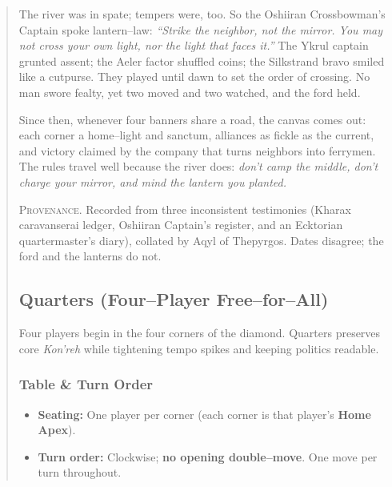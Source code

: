 \documentclass[11pt]{article}
\begin{document}
\begin{quote}
\begin{tcolorbox}[enhanced,breakable,
  colback=royal!3, colframe=royal!70!black, boxrule=0.6pt,
  left=6pt, right=6pt, top=6pt, bottom=6pt]
The river was in spate; tempers were, too. So the Oshiiran Crossbowman's Captain spoke lantern–law: \emph{“Strike the neighbor, not the mirror. You may not cross your own light, nor the light that faces it.”} The Ykrul captain grunted assent; the Aeler factor shuffled coins; the Silkstrand bravo smiled like a cutpurse. They played until dawn to set the order of crossing. No man swore fealty, yet two moved and two watched, and the ford held.

Since then, whenever four banners share a road, the canvas comes out: each corner a home–light and sanctum, alliances as fickle as the current, and victory claimed by the company that turns neighbors into ferrymen. The rules travel well because the river does: \emph{don’t camp the middle, don’t charge your mirror, and mind the lantern you planted.} 
\medskip

\noindent\textsc{Provenance.} Recorded from three inconsistent testimonies (Kharax caravanserai ledger, Oshiiran Captain’s register, and an Ecktorian quartermaster’s diary), collated by Aqyl of Thepyrgos. Dates disagree; the ford and the lanterns do not.
\end{tcolorbox}

\subsection{Quarters (Four–Player Free–for–All)}
\label{sec:quarters}

\noindent Four players begin in the four corners of the diamond. Quarters preserves core \emph{Kon'reh} while tightening tempo spikes and keeping politics readable.

\subsubsection*{Table \& Turn Order}
\begin{itemize}[leftmargin=1.3em,itemsep=0.25em]
  \item \textbf{Seating:} One player per corner (each corner is that player’s \textbf{Home Apex}).
  \item \textbf{Turn order:} Clockwise; \textbf{no opening double–move}. One move per turn throughout.
\end{itemize}


\end{quote}
\end{document}
